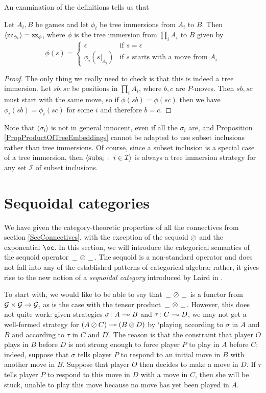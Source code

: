 An examination of the definitions tells us that
\begin{proposition}
  Let $A_i,B$ be games and let $\phi_i$ be tree immersions from $A_i$ to $B$.  
  Then $\langle \operatorname{zz}_{\phi_i} \rangle = \operatorname{zz}_\phi$, where $\phi$ is the tree immersion from $\prod_iA_i$ to $B$ given by
  \[
    \phi(s) = \begin{cases}
      \epsilon & \text{if $s=\epsilon$} \\
      \phi_i(s\vert_{A_i}) & \text{if $s$ starts with a move from $A_i$}
    \end{cases}
    \]
  \label{PropProductOfTreeEmbeddings}
\end{proposition}
\begin{proof}
  The only thing we really need to check is that this is indeed a tree immersion.  
  Let $sb,sc$ be positions in $\prod_iA_i$, where $b,c$ are $P$-moves.
  Then $sb,sc$ must start with the same move, so if $\phi(sb)=\phi(sc)$ then we have $\phi_i(sb)=\phi_i(sc)$ for some $i$ and therefore $b=c$.
\end{proof}

Note that $\langle\sigma_i\rangle$ is not in general innocent, even if all the $\sigma_i$ are, and Proposition \ref{PropProductOfTreeEmbeddings} cannot be adapted to use subset inclusions rather than tree immersions.
Of course, since a subset inclusion is a special case of a tree immersion, then $\langle \operatorname{subs}_i\;\colon\; i \in \mathcal I\rangle$ is always a tree immersion strategy for any set $\mathcal I$ of subset inclusions.

\section{Sequoidal categories}

We have given the category-theoretic properties of all the connectives from section \ref{SecConnectives}, with the exception of the sequoid $\oslash$ and the exponential $\oc$.
In this section, we will introduce the categorical semantics of the sequoid operator $\,\underline{\hspace{1.5ex}}\,\oslash\,\underline{\hspace{1.5ex}}\,$.  
The sequoid is a non-standard operator and does not fall into any of the established patterns of categorical algebra; rather, it gives rise to the new notion of a \emph{sequoidal category} introduced by Laird in \cite{laird02}.

To start with, we would like to be able to say that $\,\underline{\hspace{1.5ex}}\,\oslash\,\underline{\hspace{1.5ex}}\,$ is a functor from $\mathcal G \times \mathcal G \to \mathcal G$, as is the case with the tensor product $\,\underline{\hspace{1.5ex}}\,\otimes\,\underline{\hspace{1.5ex}}\,$.  
However, this does not quite work: given strategies $\sigma\colon A \multimap B$ and $\tau\colon C \multimap D$, we may not get a well-formed strategy for $(A \oslash C) \multimap (B \oslash D)$ by `playing according to $\sigma$ in $A$ and $B$ and according to $\tau$ in $C$ and $D$'.  
The reason is that the constraint that player $O$ plays in $B$ before $D$ is not strong enough to force player $P$ to play in $A$ before $C$; indeed, suppose that $\sigma$ tells player $P$ to respond to an initial move in $B$ with another move in $B$.  
Suppose that player $O$ then decides to make a move in $D$.  
If $\tau$ tells player $P$ to respond to this move in $D$ with a move in $C$, then she will be stuck, unable to play this move because no move has yet been played in $A$.

